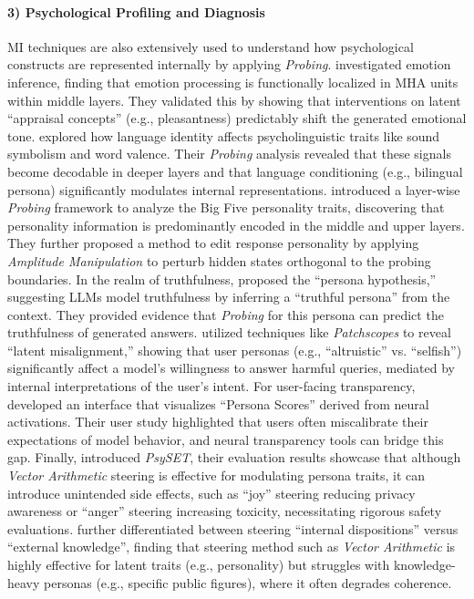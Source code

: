 \documentclass[11pt,letterpaper]{mystyle}
\begin{document}
  \paragraph{3) Psychological Profiling and Diagnosis}
  MI techniques are also extensively used to understand how psychological constructs are represented internally by applying \textit{Probing}.
  \citet{tak-etal-2025-mechanistic} investigated emotion inference, finding that emotion processing is functionally localized in MHA units within middle layers. 
  They validated this by showing that interventions on latent ``appraisal concepts'' (e.g., pleasantness) predictably shift the generated emotional tone.
  \citet{yuan2025monolingual} explored how language identity affects psycholinguistic traits like sound symbolism and word valence. Their \textit{Probing} analysis revealed that these signals become decodable in deeper layers and that language conditioning (e.g., bilingual persona) significantly modulates internal representations.
  \citet{ju2025probing} introduced a layer-wise \textit{Probing} framework to analyze the Big Five personality traits, discovering that personality information is predominantly encoded in the middle and upper layers. They further proposed a method to edit response personality by applying \textit{Amplitude Manipulation} to perturb hidden states orthogonal to the probing boundaries.
  In the realm of truthfulness, \citet{joshi2024personas} proposed the ``persona hypothesis,'' suggesting LLMs model truthfulness by inferring a ``truthful persona'' from the context. They provided evidence that \textit{Probing} for this persona can predict the truthfulness of generated answers.
  \citet{ghandeharioun2024whos} utilized techniques like \textit{Patchscopes} to reveal ``latent misalignment,'' showing that user personas (e.g., ``altruistic'' vs. ``selfish'') significantly affect a model's willingness to answer harmful queries, mediated by internal interpretations of the user's intent.
  For user-facing transparency, \citet{karny2025neural} developed an interface that visualizes ``Persona Scores'' derived from neural activations. Their user study highlighted that users often miscalibrate their expectations of model behavior, and neural transparency tools can bridge this gap.
  Finally, \citet{banayeeanzade2025psychological} introduced \textit{PsySET}, their evaluation results showcase that although \textit{Vector Arithmetic} steering is effective for modulating persona traits, it can introduce unintended side effects, such as ``joy'' steering reducing privacy awareness or ``anger'' steering increasing toxicity, necessitating rigorous safety evaluations.
  \citet{bas2025steering} further differentiated between steering ``internal dispositions'' versus ``external knowledge'', finding that steering method such as \textit{Vector Arithmetic} is highly effective for latent traits (e.g., personality) but struggles with knowledge-heavy personas (e.g., specific public figures), where it often degrades coherence.
\end{document}
